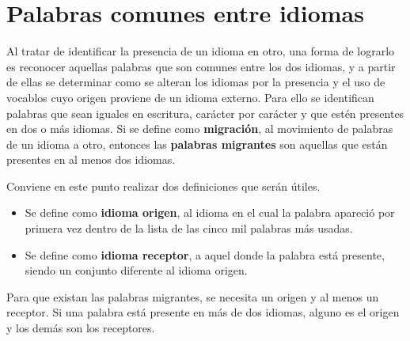 \section{Palabras comunes entre idiomas} %

Al tratar de identificar la presencia de un idioma en otro, una forma de
lograrlo es reconocer aquellas palabras que son comunes entre los dos idiomas,
y a partir de ellas se determinar como se alteran los idiomas por la presencia
y el uso de vocablos cuyo origen proviene de un idioma externo.  Para ello se
identifican palabras que sean iguales en escritura, carácter por carácter y que
estén presentes en dos o más idiomas.  Si se define como \textbf{migración}, al
movimiento de palabras de un idioma a otro, entonces las \textbf{palabras
migrantes}  son aquellas que están presentes en al menos dos idiomas.  

Conviene en este punto realizar dos definiciones que serán útiles.
\begin{itemize}
\item 
Se define como  \textbf{idioma origen}, al idioma en el cual la palabra
apareció por primera vez dentro de la lista de las cinco mil palabras más
usadas.  
\item 
Se define como \textbf{idioma receptor}, a  aquel donde la palabra está
presente, siendo un conjunto diferente al idioma origen.  
\end{itemize}

Para que existan las palabras migrantes, se necesita un origen y al menos un
receptor. Si una palabra está presente en más de dos idiomas, alguno es el
origen y los demás son los receptores. 

